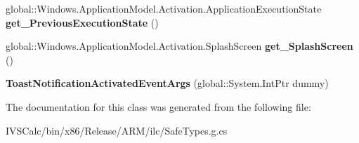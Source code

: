 \begin{DoxyCompactItemize}
global\+::\+Windows.\+Application\+Model.\+Activation.\+Application\+Execution\+State {\bfseries get\+\_\+\+Previous\+Execution\+State} ()
\item 
\mbox{\label{class_windows_1_1_application_model_1_1_activation_1_1_toast_notification_activated_event_args_a90827792bc4f708f1af8e353d6ed679d}} 
global\+::\+Windows.\+Application\+Model.\+Activation.\+Splash\+Screen {\bfseries get\+\_\+\+Splash\+Screen} ()
\item 
\mbox{\label{class_windows_1_1_application_model_1_1_activation_1_1_toast_notification_activated_event_args_aeba1d5057c3f3ef8e59a2c8c8c96c3c9}} 
{\bfseries Toast\+Notification\+Activated\+Event\+Args} (global\+::\+System.\+Int\+Ptr dummy)
\end{DoxyCompactItemize}


The documentation for this class was generated from the following file\+:\begin{DoxyCompactItemize}
\item 
I\+V\+S\+Calc/bin/x86/\+Release/\+A\+R\+M/ilc/Safe\+Types.\+g.\+cs\end{DoxyCompactItemize}
